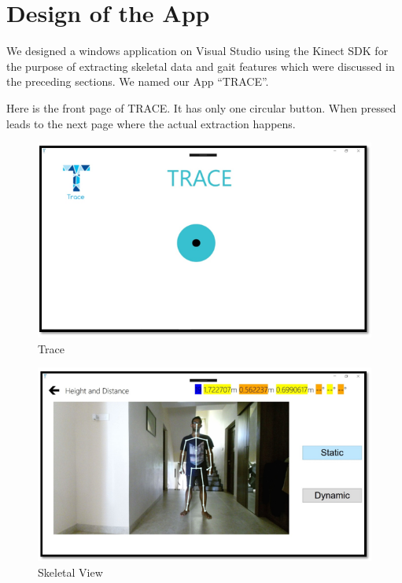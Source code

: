 \section{Design of the App } \label{ Design of the App} 
\noindent We designed a windows application on Visual Studio using the Kinect SDK for the purpose of extracting skeletal data and gait features which were discussed in the preceding sections. We named our App “TRACE”.

Here is the front page of TRACE. It has only one circular button. When pressed leads to the next page where the actual extraction happens.

\begin{figure}[h]
\centering
\includegraphics[scale=0.7]{trace.png}
\caption{Trace}
\end{figure} 

\begin{figure}[h]
\centering
\includegraphics[scale=0.7]{john.png}
\caption{Skeletal View}
\end{figure}

